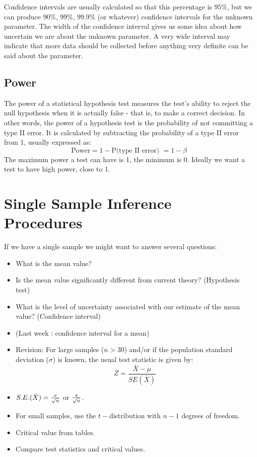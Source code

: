 Confidence intervals are usually calculated so that this percentage is $95\%$, but we can produce $90\%$, $99\%$, $99.9\%$ (or whatever) confidence intervals for the unknown parameter. The width of the confidence interval gives us some idea about how uncertain we are about the unknown parameter. A very wide interval may indicate that more data should be collected before anything very definite can be said about the parameter.
\subsection{Power }
The power of a statistical hypothesis test measures the test's ability to reject the null hypothesis when it is actually false - that is, to make a correct decision. In other words, the power of a hypothesis test is the probability of not committing a type II error. It is calculated by subtracting the probability of a type II error from 1, usually expressed as: 
\[\mbox{Power} = 1 - \mbox{P(type II error) } = 1- \beta \]The maximum power a test can have is 1, the minimum is 0. Ideally we want a test to have high power, close to 1.

\section{Single Sample Inference Procedures}
If we have a single sample we might want to answer several
questions:
\begin{itemize}
	\item What is the mean value? \item Is the mean value
	significantly different from current theory? (Hypothesis test)
	\item What is the level of uncertainty associated with our
	estimate of the mean value? (Confidence interval)
\end{itemize}

\begin{itemize}
	\item (Last week : confidence interval for a mean) \item Revision:
	For large samples ($n > 30$) and/or if the population standard
	deviation ($\sigma$) is known, the usual test statistic is given
	by: \[Z =\frac{\bar{X} - \mu}{SE(\bar{X})}\]
	
	\item $S.E.(\bar{X}) = { \sigma \over \sqrt{n}} $ or ${s \over \sqrt{n}}$. 
	\item For small samples, use the $t-$distribution with $n-1$ degrees of freedom.
	\item Critical value from tables.
	\item Compare test statistics and critical values.
\end{itemize}

